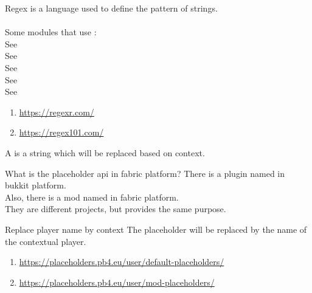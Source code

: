 \clearpage
{}\label{term:regex}

Regex is a language used to define the pattern of strings.\\\\
Some modules that use :\\
See~\\
See~\\
See~\\
See~\\
See~\\

\begin{enumerate}
    \item \url{https://regexr.com/}
    \item \url{https://regex101.com/}
\end{enumerate}


\clearpage
{}

A  is a string which will be replaced based on context.

\begin{tips}{What is the placeholder api in fabric platform?}
    There is a plugin named  in bukkit platform.\\
    Also, there is a mod named  in fabric platform.\\
    They are different projects, but provides the same purpose.
\end{tips}

\begin{example}{Replace player name by context}
    The placeholder  will be replaced by the name of the contextual player.
\end{example}

\begin{enumerate}
    \item \url{https://placeholders.pb4.eu/user/default-placeholders/}
    \item \url{https://placeholders.pb4.eu/user/mod-placeholders/}
\end{enumerate}


